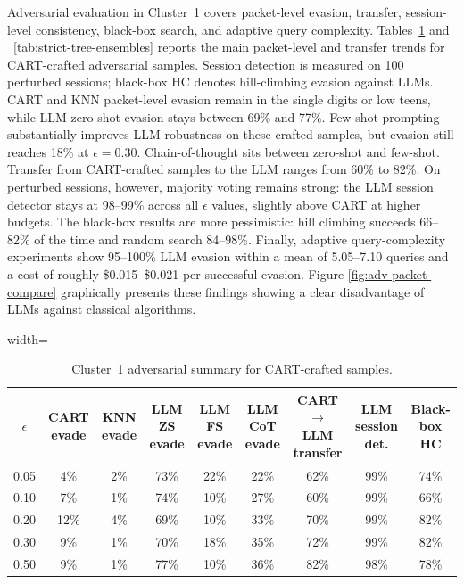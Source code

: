 \documentclass[conference]{IEEEtran}
\begin{document}
Adversarial evaluation in Cluster~1 covers packet-level evasion, transfer, session-level consistency, black-box search, and adaptive query complexity. Tables~\ref{tab:strict-adv} and ~\ref{tab:strict-tree-ensembles} reports the main packet-level and transfer trends for CART-crafted adversarial samples. Session detection is measured on 100 perturbed sessions; black-box HC denotes hill-climbing evasion against LLMs. CART and KNN packet-level evasion remain in the single digits or low teens, while LLM zero-shot evasion stays between 69\% and 77\%. Few-shot prompting substantially improves LLM robustness on these crafted samples, but evasion still reaches 18\% at $\epsilon=0.30$. Chain-of-thought sits between zero-shot and few-shot. Transfer from CART-crafted samples to the LLM ranges from 60\% to 82\%. On perturbed sessions, however, majority voting remains strong: the LLM session detector stays at 98--99\% across all $\epsilon$ values, slightly above CART at higher budgets. The black-box results are more pessimistic: hill climbing succeeds 66--82\% of the time and random search 84--98\%. Finally, adaptive query-complexity experiments show 95--100\% LLM evasion within a mean of 5.05--7.10 queries and a cost of roughly \$0.015--\$0.021 per successful evasion. Figure \ref{fig:adv-packet-compare} graphically presents these findings showing a clear disadvantage of LLMs against classical algorithms.

\begin{table}[t]
\centering
\caption{Cluster~1 adversarial summary for CART-crafted samples.}
\label{tab:strict-adv}
\footnotesize
\begin{adjustbox}{width=\textwidth}
\begin{tabular}{ccccccccc}
\toprule
$\epsilon$ & CART evade & KNN evade & LLM ZS evade & LLM FS evade & LLM CoT evade & CART$\rightarrow$LLM transfer & LLM session det. & Black-box HC \\
\midrule
0.05 & 4\%  & 2\% & 73\% & 22\% & 22\% & 62\% & 99\% & 74\% \\
0.10 & 7\%  & 1\% & 74\% & 10\% & 27\% & 60\% & 99\% & 66\% \\
0.20 & 12\% & 4\% & 69\% & 10\% & 33\% & 70\% & 99\% & 82\% \\
0.30 & 9\%  & 1\% & 70\% & 18\% & 35\% & 72\% & 99\% & 82\% \\
0.50 & 9\%  & 1\% & 77\% & 10\% & 36\% & 82\% & 98\% & 78\% \\
\bottomrule
\end{tabular}
\end{adjustbox}
\end{table}
\end{document}
